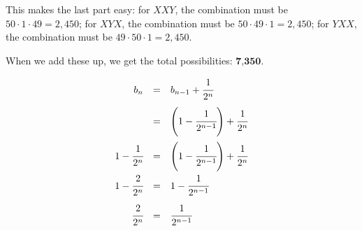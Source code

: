 \documentclass[a4paper]{article}
\begin{document}
This makes the last part easy: for $XXY$, the combination must be $50 \cdot 1 \cdot 49 = 2,450$; for $XYX$, the combination must be $50 \cdot 49 \cdot 1 = 2,450$; for $YXX$, the combination must be $49 \cdot 50 \cdot 1 = 2,450$.

When we add these up, we get the total possibilities: $\textbf{7,350}$.

\begin{equation}
\begin{array}{rll}
b_n & = & b_{n-1} + \cfrac{1}{2^n} \\[.15in]
& = & \left( 1-\cfrac{1}{2^{n-1}} \right) + \cfrac{1}{2^n} \\[.2in]
1- \cfrac{1}{2^n} & = & \left( 1-\cfrac{1}{2^{n-1}} \right) + \cfrac{1}{2^n} \\[.15in]
1- \cfrac{2}{2^n} & = & 1-\cfrac{1}{2^{n-1}} \\[.15in]
\cfrac{2}{2^n} & = & \cfrac{1}{2^{n-1}} \\[.15in]
\end{array}
\end{equation}	
\end{document}
